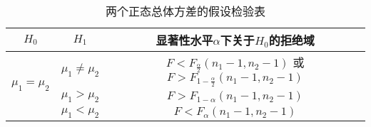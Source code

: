 \begin{table}[ht]
	\centering
	\begin{tabular}{c*2{|c}}
		\hline
		\(H_0\) & \(H_1\)
		& 显著性水平\(\alpha\)下关于\(H_0\)的拒绝域 \\ \hline
		& \(\mu_1\neq\mu_2\)
		& \(F<F_{\frac{\alpha}{2}}(n_1-1,n_2-1)\)
		或\(F>F_{1-\frac{\alpha}{2}}(n_1-1,n_2-1)\) \\ 
		& \(\mu_1>\mu_2\)
		& \(F>F_{1-\alpha}(n_1-1,n_2-1)\) \\ 
		& \(\mu_1<\mu_2\)
		& \(F<F_\alpha(n_1-1,n_2-1)\) \\
		\hline
	\end{tabular}
	\caption{两个正态总体方差的假设检验表}
	\label{table:假设检验.两个正态总体方差的假设检验表}
\end{table}
